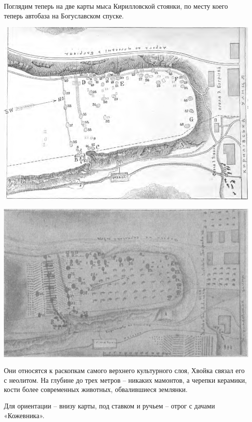 Поглядим теперь на две карты мыса Кирилловской стоянки, по месту коего теперь автобаза на Богуславском спуске.

\begin{center}
\includegraphics[width=\linewidth]{chast-kirvys/kirstoy/1893-hvoyka-01.png}
\end{center}

\begin{center}
\includegraphics[width=\linewidth]{chast-kirvys/kirstoy/1893-hvoyka-02.png}
\end{center}

Они относятся к раскопкам самого верхнего культурного слоя, Хвойка связал его с неолитом. На глубине до трех метров – никаких мамонтов, а черепки керамики, кости более современных животных, обвалившиеся землянки.  

Для ориентации – внизу карты, под ставком и ручьем – отрог с дачами «Кожевника».

